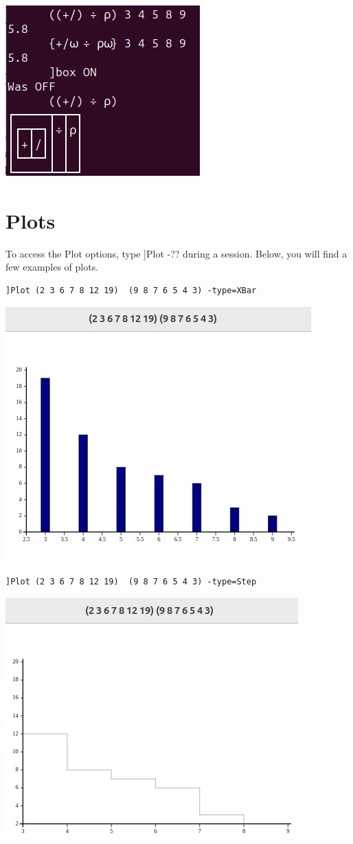 \documentclass[a4paper,12pt]{book}
\begin{document}
\includegraphics{srcfigs/avg-in-box-format}

\newpage
\section{Plots}
To access the Plot options,
type ]Plot -?? during a session.
  Below, you will find a few examples of plots.
\begin{verbatim}
]Plot (2 3 6 7 8 12 19)  (9 8 7 6 5 4 3) -type=XBar
\end{verbatim}
\includegraphics{srcfigs/kaplan-meyer-xbar.jpg}

\begin{verbatim}
]Plot (2 3 6 7 8 12 19)  (9 8 7 6 5 4 3) -type=Step
\end{verbatim}
\includegraphics{srcfigs/kaplan-meyer-steps.jpg}
\end{document}
